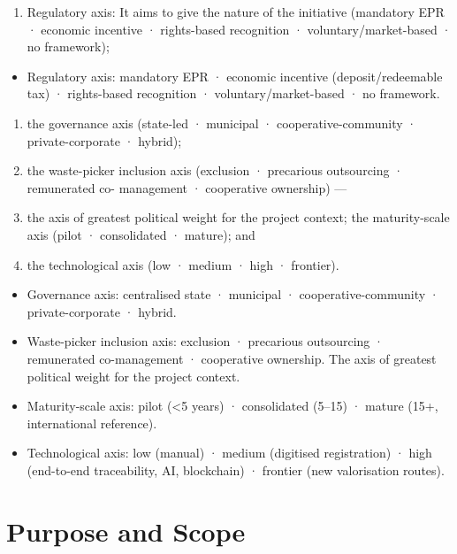 \documentclass[
  12pt,
  oneside]{book}
\providecommand{\tightlist}{%
  \setlength{\itemsep}{0pt}\setlength{\parskip}{0pt}}
\begin{document}
\begin{enumerate}
\def\labelenumi{\arabic{enumi}.}
\tightlist
\item
  Regulatory axis: It aims to give the nature of the initiative
  (mandatory EPR · economic incentive · rights-based recognition ·
  voluntary/market-based · no framework);
\end{enumerate}

\begin{itemize}
\tightlist
\item
  Regulatory axis: mandatory EPR · economic incentive
  (deposit/redeemable tax) · rights-based recognition ·
  voluntary/market-based · no framework.
\end{itemize}

\begin{enumerate}
\def\labelenumi{\arabic{enumi}.}
\setcounter{enumi}{1}
\item
  the governance axis (state-led · municipal · cooperative-community ·
  private-corporate · hybrid);
\item
  the waste-picker inclusion axis (exclusion · precarious outsourcing ·
  remunerated co- management · cooperative ownership) ---
\item
  the axis of greatest political weight for the project context; the
  maturity-scale axis (pilot · consolidated · mature); and
\item
  the technological axis (low · medium · high · frontier).
\end{enumerate}

\begin{itemize}
\tightlist
\item
  Governance axis: centralised state · municipal · cooperative-community
  · private-corporate · hybrid.
\item
  Waste-picker inclusion axis: exclusion · precarious outsourcing ·
  remunerated co-management · cooperative ownership. The axis of
  greatest political weight for the project context.
\item
  Maturity-scale axis: pilot (\textless5 years) · consolidated (5--15) ·
  mature (15+, international reference).
\item
  Technological axis: low (manual) · medium (digitised registration) ·
  high (end-to-end traceability, AI, blockchain) · frontier (new
  valorisation routes).
\end{itemize}

\section{Purpose and Scope}\label{purpose-and-scope}
\end{document}
